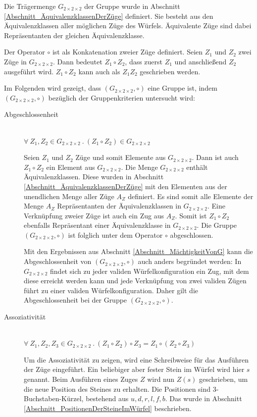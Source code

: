 \documentclass[12pt,a4paper, usenames, dvipsnames]{article}
\theoremstyle{mystyle}
\theoremstyle{definition}
\newcommand{\Gtwo}{\ensuremath{G_{2\times 2\times 2}}}
\begin{document}
Die Trägermenge $\Gtwo$ der Gruppe wurde in Abschnitt \ref{Abschnitt_ÄquivalenzklassenDerZüge} definiert. Sie besteht aus den Äquivalenzklassen aller möglichen Züge des Würfels. Äquivalente Züge sind dabei Repräsentanten der gleichen Äquivalenzklasse.


Der Operator $\circ$ ist als Konkatenation zweier Züge definiert. Seien $Z_1$ und $Z_2$ zwei Züge in $\Gtwo$. Dann bedeutet $Z_1 \circ Z_2$, dass zuerst $Z_1$ und anschließend $Z_2$ ausgeführt wird. $Z_1 \circ Z_2$ kann auch als $Z_1Z_2$ geschrieben werden.

Im Folgenden wird gezeigt, dass $(\Gtwo, \circ)$ eine Gruppe ist, indem $(\Gtwo, \circ)$ bezüglich der Gruppenkriterien untersucht wird:


\begin{description}
\item [Abgeschlossenheit] \ \\
$\forall \ Z_1,Z_2 \in \Gtwo \  . \   (Z_1 \circ Z_2) \in \Gtwo $ 


Seien $Z_1$ und $Z_2$ Züge und somit Elemente aus $\Gtwo$. Dann ist auch $Z_1 \circ Z_2$ ein Element aus $\Gtwo$. Die Menge $\Gtwo$ enthält Äquivalenzklassen. Diese wurden in Abschnitt \ref{Abschnitt_ÄquivalenzklassenDerZüge} mit den Elementen aus der unendlichen Menge aller Züge $A_Z$ definiert. Es sind somit alle Elemente der Menge $A_Z$ Repräsentanten der Äquivalenzklassen in $\Gtwo$. Eine Verknüpfung zweier Züge ist auch ein Zug aus $A_Z$. Somit ist $Z_1 \circ Z_2$ ebenfalls Repräsentant einer Äquivalenzklasse in $\Gtwo$. Die Gruppe $(\Gtwo, \circ)$ ist folglich unter dem Operator $\circ$ abgeschlossen.
 
Mit den Ergebnissen aus Abschnitt \ref{Abschnitt_MächtigkeitVonG} kann die Abgeschlossenheit von $(\Gtwo, \circ)$ auch anders begründet werden: In $\Gtwo$ findet sich zu jeder validen Würfel\-konfiguration ein Zug, mit dem diese erreicht werden kann und jede Verknüpfung von zwei validen Zügen führt zu einer validen Würfelkonfiguration. Daher gilt die Abgeschlossenheit bei der Gruppe $(\Gtwo, \circ)$.


\item [Assoziativität] \ \\
$\forall \ Z_1,Z_2,Z_3 \in \Gtwo \ . \ (Z_1 \circ Z_2) \circ Z_3 = Z_1 \circ (Z_2 \circ Z_3)$ 


Um die Assoziativität zu zeigen, wird eine Schreibweise für das Ausführen der Züge eingeführt. Ein beliebiger aber fester Stein im Würfel wird hier $s$ genannt. Beim Ausführen eines Zuges $Z$ wird nun $Z(s)$ geschrieben, um die neue Position des Steines zu erhalten. Die Positionen sind 3-Buchstaben-Kürzel, bestehend aus $u, d, r, l, f, b$. Das wurde in Abschnitt \ref{Abschnitt_PositionenDerSteineImWürfel} beschrieben.


\end{description}
\end{document}
